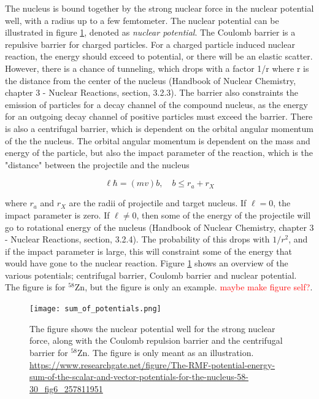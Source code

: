 \documentclass[a4paper,11pt,twoside]{book}
\begin{document}
The nucleus is bound together by the strong nuclear force in the nuclear potential well, with a radius up to a few femtometer. The nuclear potential can be illustrated in figure \ref{fig:sumOfPotentials}, denoted as \textit{nuclear potential}. The Coulomb barrier is a repulsive barrier for charged particles. For a charged particle induced nuclear reaction, the energy should exceed to potential, or there will be an elastic scatter. However, there is a chance of tunneling, which drops with a factor 1/r where r is the distance from the center of the nucleus (Handbook of Nuclear Chemistry, chapter 3 - Nuclear Reactions, section, 3.2.3). The barrier also constraints the emission of particles for a decay channel of the compound nucleus, as the energy for an outgoing decay channel of positive particles must exceed the barrier. There is also a centrifugal barrier, which is dependent on the orbital angular momentum of the the nucleus. The orbital angular momentum is dependent on the mass and energy of the particle, but also the impact parameter of the reaction, which is the "distance" between the projectile and the nucleus

\begin{equation}
    \ell\hbar = (mv)b, \quad b\leq r_a + r_X
\end{equation}

\noindent where $r_a$ and $r_X$ are the radii of projectile and target nucleus. If $\ell=0$, the impact parameter is zero. If $\ell\neq 0$, then some of the energy of the projectile will go to rotational energy of the nucleus (Handbook of Nuclear Chemistry, chapter 3 - Nuclear Reactions, section, 3.2.4). The probability of this drops with $1/r^2$, and if the impact parameter is large, this will constraint some of the energy that would have gone to the nuclear reaction. Figure \ref{fig:sumOfPotentials} shows an overview of the various potentials; centrifugal barrier, Coulomb barrier and nuclear potential. The figure is for $^{58}$Zn, but the figure is only an example. \textcolor{red}{maybe make figure self?}. 


\begin{figure}
    \centering
    \texttt{[image: sum\_of\_potentials.png]}
    \caption{The figure shows the nuclear potential well for the strong nuclear force, along with the Coulomb repulsion barrier and the centrifugal barrier for $^{58}$Zn. The figure is only meant as an illustration. \url{https://www.researchgate.net/figure/The-RMF-potential-energy-sum-of-the-scalar-and-vector-potentials-for-the-nucleus-58-30_fig6_257811951} }
    \label{fig:sumOfPotentials}
\end{figure}
\end{document}
